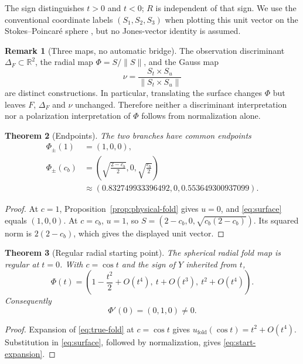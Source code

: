 \documentclass[11pt]{article}
\newtheorem{theorem}{Theorem}[section]
\theoremstyle{definition}
\newtheorem{remark}[theorem]{Remark}
\newcommand{\DiscF}{\Delta_F}
\begin{document}
The sign distinguishes $t>0$ and $t<0$; $R$ is independent of that sign.
We use the conventional coordinate labels $(S_1,S_2,S_3)$ when plotting this
unit vector on the Stokes--Poincar\'e sphere
\cite{stokes1852,poincare1892}, but no Jones-vector identity is assumed.

\begin{remark}[Three maps, no automatic bridge]\label{rem:three-maps}
The observation discriminant $\DiscF\subset\mathbb R^2$, the radial map
$\Phi=S/\lVert S\rVert$, and the Gauss map
\[
\nu=\frac{S_t\times S_u}{\lVert S_t\times S_u\rVert}
\]
are distinct constructions.  In particular, translating the surface changes
$\Phi$ but leaves $F$, $\DiscF$ and $\nu$ unchanged.  Therefore neither a
discriminant interpretation nor a polarization interpretation of $\Phi$
follows from normalization alone.
\end{remark}

\begin{theorem}[Endpoints]\label{thm:endpoints}
The two branches have common endpoints
\begin{align}
\Phi_\pm(1)&=(1,0,0),\\
\Phi_\pm(c_b)&=
\left(
\sqrt{\frac{2-c_b}{2}},
0,
\sqrt{\frac{c_b}{2}}
\right)\\
&\approx(0.832749933396492,0,0.553649300937099).
\end{align}
\end{theorem}

\begin{proof}
At $c=1$, Proposition~\ref{prop:physical-fold} gives $u=0$, and
\eqref{eq:surface} equals $(1,0,0)$.  At $c=c_b$, $u=1$, so
$S=(2-c_b,0,\sqrt{c_b(2-c_b)})$.  Its squared norm is
$2(2-c_b)$, which gives the displayed unit vector.
\end{proof}

\begin{theorem}[Regular radial starting point]\label{thm:regular-start}
The spherical radial fold map is regular at $t=0$.  With $c=\cos t$ and the sign of
$Y$ inherited from $t$,
\begin{equation}\label{eq:start-expansion}
\Phi(t)=
\left(
1-\frac{t^2}{2}+O(t^4),
\ t+O(t^3),
\ t^2+O(t^4)
\right).
\end{equation}
Consequently
\[
\Phi'(0)=(0,1,0)\neq0.
\]
\end{theorem}

\begin{proof}
Expansion of \eqref{eq:true-fold} at $c=\cos t$ gives
$u_{\mathrm{fold}}(\cos t)=t^2+O(t^4)$.  Substitution in
\eqref{eq:surface}, followed by normalization, gives
\eqref{eq:start-expansion}.
\end{proof}
\end{document}
